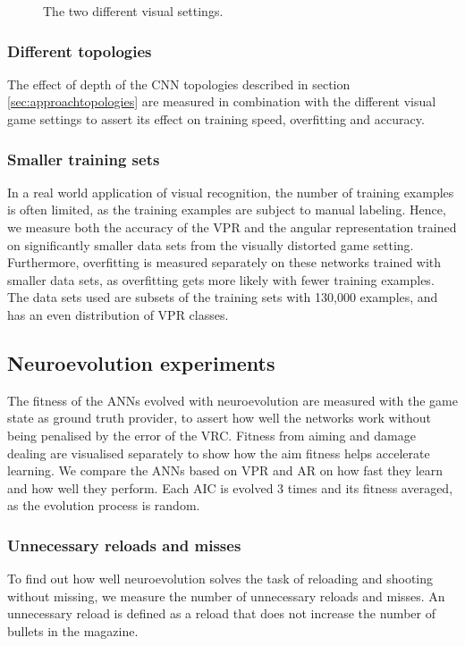 \begin{figure}[H]
	\begin{scriptsize}
		
	\end{scriptsize}
	\caption{The two different visual settings.}
	\label{fig:light}
\end{figure}

\subsubsection{Different topologies}
The effect of depth of the CNN topologies described in section \ref{sec:approachtopologies} are measured in combination with the different visual game settings to assert its effect on training speed, overfitting and accuracy.

\subsubsection{Smaller training sets}
In a real world application of visual recognition, the number of training examples is often limited, as the training examples are subject to manual labeling. Hence, we measure both the accuracy of the VPR and the angular representation trained on significantly smaller data sets from the visually distorted game setting. Furthermore, overfitting is measured separately on these networks trained with smaller data sets, as overfitting gets more likely with fewer training examples. The data sets used are subsets of the training sets with 130,000 examples, and has an even distribution of VPR classes.

 
\subsection{Neuroevolution experiments}
The fitness of the ANNs evolved with neuroevolution are measured with the game state as ground truth provider, to assert how well the networks work without being penalised by the error of the VRC. Fitness from aiming and damage dealing are visualised separately to show how the aim fitness helps accelerate learning. We compare the ANNs based on VPR and AR on how fast they learn and how well they perform. Each AIC is evolved 3 times and its fitness averaged, as the evolution process is random.

\subsubsection{Unnecessary reloads and misses}
To find out how well neuroevolution solves the task of reloading and shooting without missing, we measure the number of unnecessary reloads and misses. An unnecessary reload is defined as a reload that does not increase the number of bullets in the magazine.

